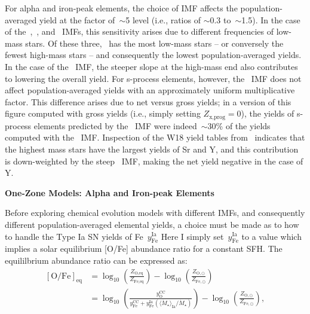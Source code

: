 \documentclass[12pt]{article}
\begin{document}
For alpha and iron-peak elements, the choice of IMF affects the
population-averaged yield at the factor of~$\sim$5 level (i.e., ratios of
$\sim$0.3 to~$\sim$1.5).
In the case of the~\citet{Salpeter1955},~\citet{Miller1979},
and~\citet{Chabrier2003} IMFs, this sensitivity arises due to different
frequencies of low-mass stars.
Of these three,~\citet{Salpeter1955} has the most low-mass stars -- or
conversely the fewest high-mass stars -- and consequently the lowest
population-averaged yields.
In the case of the~\citet{Scalo1986} IMF, the steeper slope at the high-mass
end also contributes to lowering the overall yield.
For s-process elements, however, the~\citet{Scalo1986} IMF does not affect
population-averaged yields with an approximately uniform multiplicative factor.
This difference arises due to net versus gross yields; in a version of this
figure computed with gross yields (i.e., simply setting $Z_\text{x,prog} = 0$),
the yields of s-process elements predicted by the~\citet{Scalo1986} IMF were
indeed~$\sim$30\% of the yields computed with the~\citet{Kroupa2001} IMF.
Inspection of the W18 yield tables from~\citet{Sukhbold2016} indicates that the
highest mass stars have the largest yields of Sr and Y, and this contribution
is down-weighted by the steep~\citet{Scalo1986} IMF, making the net yield
negative in the case of Y.
\par\null\par\noindent
\textbf{One-Zone Models: Alpha and Iron-peak Elements}
\par\noindent
Before exploring chemical evolution models with different IMFs, and
consequently different population-averaged elemental yields, a choice must be
made as to how to handle the Type Ia SN yields of Fe~$y_\text{Fe}^\text{Ia}$
Here I simply set~$y_\text{Fe}^\text{Ia}$ to a value which implies a solar
equilibrium [O/Fe] abundance ratio for a constant SFH.
The equililbrium abundance ratio can be expressed as:
\begin{subequations}\begin{align}
[\text{O/Fe}]_\text{eq} &=
\log_{10}\left(\frac{Z_\text{O,eq}}{Z_\text{Fe,eq}}\right) -
\log_{10}\left(\frac{Z_{\text{O},\odot}}{Z_{\text{Fe},\odot}}\right)
\\
&= \log_{10}\left(\frac{y_\text{O}^\text{CC}}{y_\text{Fe}^\text{CC} +
y_\text{Fe}^\text{Ia}(\langle\dot{M}_\star\rangle_\text{Ia} / \dot{M}_\star)}
\right) -
\log_{10}\left(\frac{Z_{\text{O},\odot}}{Z_{\text{Fe},\odot}}\right),
\end{align}\end{subequations}
\end{document}
